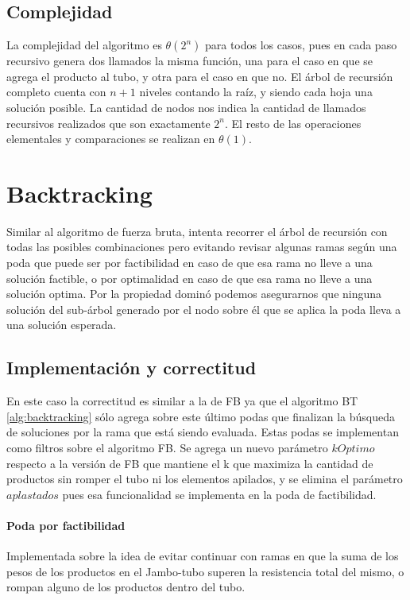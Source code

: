 \documentclass[10pt,a4paper]{article}
\begin{document}
\subsection{Complejidad}
La complejidad del algoritmo es $\theta(2^n)$ para todos los casos, pues en cada paso recursivo genera dos llamados la misma función, una para el caso en que se agrega el producto al tubo, y otra para el caso en que no. El árbol de recursión completo cuenta con $n + 1$ niveles contando la raíz, y siendo cada hoja una solución posible. La cantidad de nodos nos indica la cantidad de llamados recursivos realizados que son exactamente $2^n$.
El resto de las operaciones elementales y comparaciones se realizan en $\theta(1)$.

\section{Backtracking} \label{sec:backtracking}
Similar al algoritmo de fuerza bruta, intenta recorrer el árbol de recursión con todas las posibles combinaciones pero evitando revisar algunas ramas según una poda que puede ser por factibilidad en caso de que esa rama no lleve a una solución factible, o por optimalidad en caso de que esa rama no lleve a una solución optima. Por la propiedad dominó podemos asegurarnos que ninguna solución del sub-árbol generado por el nodo sobre él que se aplica la poda lleva a una solución esperada.

\subsection{Implementación y correctitud}
En este caso la correctitud es similar a la de FB ya que el algoritmo BT \ref{alg:backtracking} sólo agrega sobre este último podas que finalizan la búsqueda de soluciones por la rama que está siendo evaluada. Estas podas se implementan como filtros sobre el algoritmo FB. Se agrega un nuevo parámetro $kOptimo$ respecto a la versión de FB que mantiene el k que maximiza la cantidad de productos sin romper el tubo ni los elementos apilados, y se elimina el parámetro $aplastados$ pues esa funcionalidad se implementa en la poda de factibilidad.

\paragraph{Poda por factibilidad}
Implementada sobre la idea de evitar continuar con ramas en que la suma de los pesos de los productos en el Jambo-tubo superen la resistencia total del mismo, o rompan alguno de los productos dentro del tubo.
\end{document}
